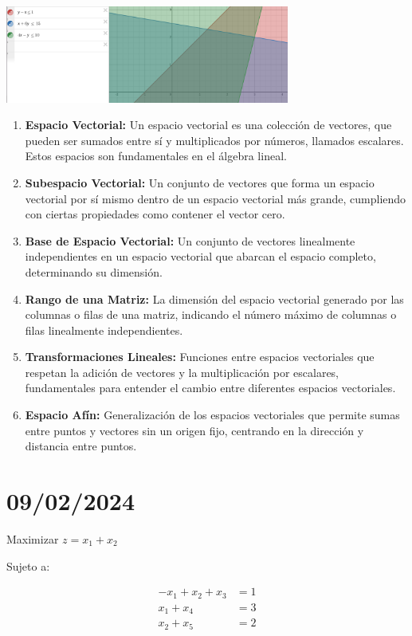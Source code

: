 \documentclass{article}
\begin{document}
\begin{center}
    \includegraphics[width=0.7\textwidth]{./imagenes/imagen2.png}
\end{center}

\begin{enumerate}
    \item \textbf{Espacio Vectorial:} Un espacio vectorial es una colección de vectores, que pueden ser sumados entre sí y multiplicados por números, llamados escalares. Estos espacios son fundamentales en el álgebra lineal.
    \item \textbf{Subespacio Vectorial:} Un conjunto de vectores que forma un espacio vectorial por sí mismo dentro de un espacio vectorial más grande, cumpliendo con ciertas propiedades como contener el vector cero.
    \item \textbf{Base de Espacio Vectorial:} Un conjunto de vectores linealmente independientes en un espacio vectorial que abarcan el espacio completo, determinando su dimensión.
    \item \textbf{Rango de una Matriz:} La dimensión del espacio vectorial generado por las columnas o filas de una matriz, indicando el número máximo de columnas o filas linealmente independientes.
    \item \textbf{Transformaciones Lineales:} Funciones entre espacios vectoriales que respetan la adición de vectores y la multiplicación por escalares, fundamentales para entender el cambio entre diferentes espacios vectoriales.
    \item \textbf{Espacio Afín:} Generalización de los espacios vectoriales que permite sumas entre puntos y vectores sin un origen fijo, centrando en la dirección y distancia entre puntos.
\end{enumerate}
\newpage
\section{09/02/2024}

Maximizar \( z = x_1 + x_2 \)

Sujeto a:

\begin{align*}
    -x_1 + x_2 + x_3 & = 1 \\
    x_1 + x_4        & = 3 \\
    x_2 + x_5        & = 2 \\
\end{align*}
\end{document}
